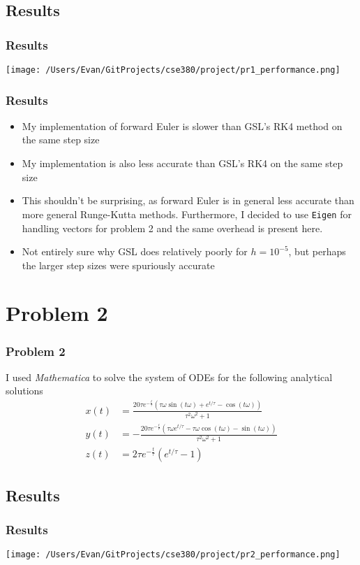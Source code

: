 \documentclass{beamer}
\begin{document}
\subsection{Results}
\begin{frame}
\frametitle{Results}
\begin{center}
\texttt{[image: /Users/Evan/GitProjects/cse380/project/pr1\_performance.png]}
\end{center}
\end{frame}

\begin{frame}
\frametitle{Results}
\begin{itemize}
\item My implementation of forward Euler is slower than GSL's RK4 method on the same step size
\item My implementation is also less accurate than GSL's RK4 on the same step size \pause
\item This shouldn't be surprising, as forward Euler is in general less accurate than more general Runge-Kutta methods. Furthermore, I decided to use \texttt{Eigen} for handling vectors for problem 2 and the same overhead is present here.
\item Not entirely sure why GSL does relatively poorly for $h=10^{-5}$, but perhaps the larger step sizes were spuriously accurate
\end{itemize}
\end{frame}

\section{Problem 2}
\begin{frame}
\frametitle{Problem 2}
I used \emph{Mathematica} to solve the system of ODEs for the following analytical solutions
\begin{align*}
x(t)&=\frac{20 \tau  e^{-\frac{t}{\tau }} \left(\tau  \omega  \sin (t \omega )+e^{t/\tau }-\cos (t \omega )\right)}{\tau ^2 \omega ^2+1}\\
y(t)&=-\frac{20 \tau  e^{-\frac{t}{\tau }} \left(\tau  \omega  e^{t/\tau }-\tau  \omega  \cos (t \omega )-\sin (t \omega )\right)}{\tau ^2 \omega ^2+1}\\
z(t)&=2 \tau  e^{-\frac{t}{\tau }} \left(e^{t/\tau }-1\right)
\end{align*}
\end{frame}

\subsection{Results}
\begin{frame}
\frametitle{Results}
\begin{center}
\texttt{[image: /Users/Evan/GitProjects/cse380/project/pr2\_performance.png]}
\end{center}
\end{frame}
\end{document}

